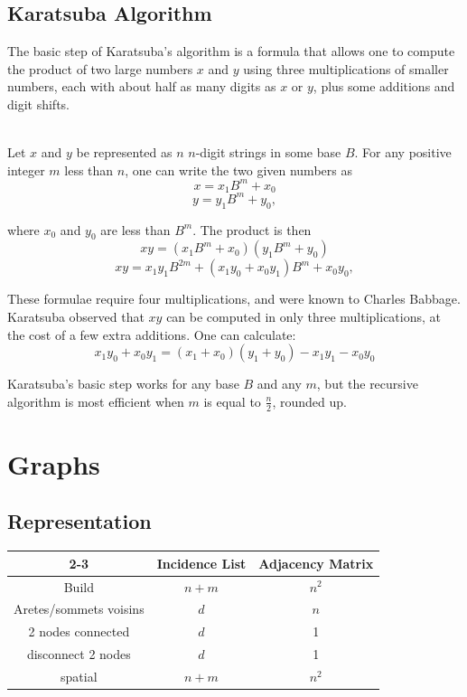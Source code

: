 \documentclass[a4paper, 12pt]{article}
\begin{document}
  \subsection{Karatsuba Algorithm}

The basic step of Karatsuba's algorithm is a formula that allows one to compute the product of two large numbers $x$ and $y$ using three multiplications of smaller numbers, each with about half as many digits as $x$ or $y$, plus some additions and digit shifts.

~\\
Let $x$ and $y$ be represented as $n$ $n$-digit strings in some base $B$. For any positive integer $m$ less than $n$, one can write the two given numbers as
$$x = x_{1}B^{m}+x_{0}$$
$$y = y_{1}B^{m}+y_{0},$$

where $x_{0}$ and $y_{0}$ are less than $B^{m}$. The product is then
$$xy=(x_{1}B^{m}+x_{0})(y_{1}B^{m}+y_{0})$$
$$xy=x_{1}y_{1}B^{2m}+(x_{1}y_{0}+x_{0}y_{1})B^{m}+x_{0}y_{0},$$

These formulae require four multiplications, and were known to Charles Babbage. Karatsuba observed that $xy$ can be computed in only three multiplications, at the cost of a few extra additions. One can calculate:
$$x_{1}y_{0}+x_{0}y_{1}=(x_{1}+x_{0})(y_{1}+y_{0})-x_{1}y_{1}-x_{0}y_{0}$$

Karatsuba's basic step works for any base $B$ and any $m$, but the recursive algorithm is most efficient when $m$ is equal to $\frac{n}{2}$, rounded up.

\section{Graphs}

  \subsection{Representation}

\begin{center}
\begin{tabular}{| c | c | c |}
\cline{2-3}
\multicolumn{1}{c |}{} & Incidence List & Adjacency Matrix \\
\hline
Build & $n+m$ & $n^2$ \\
\hline
Aretes/sommets voisins & $d$ & $n$ \\
\hline
2 nodes connected & $d$ & 1 \\
\hline
disconnect 2 nodes & $d$ & 1 \\
\hline
spatial & $n+m$ & $n^2$ \\
\hline
\end{tabular}
\end{center}
\end{document}
